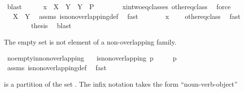 \begin{isabellebody}
\ blast\isanewline
\ \ \ \ \isamarkupfalse%
\ {\isachardoublequoteopen}x\ {\isasymin}\ X\ {\isasyminter}\ Y\ {\isasymand}\ Y\ {\isasymin}\ P{\isachardoublequoteclose}\isanewline
\ \ \ \ \ \ \isamarkupfalse%
\ x{\isacharunderscore}in{\isacharunderscore}two{\isacharunderscore}eq{\isacharunderscore}classes\ other{\isacharunderscore}eq{\isacharunderscore}class\ \isamarkupfalse%
\ force\isanewline
\ \ \ \ \isamarkupfalse%
\ \isamarkupfalse%
\ {\isachardoublequoteopen}X\ {\isacharequal}\ Y{\isachardoublequoteclose}\ \isamarkupfalse%
\ assms\ is{\isacharunderscore}non{\isacharunderscore}overlapping{\isacharunderscore}def\ \isamarkupfalse%
\ fast\isanewline
\ \ \ \ \isamarkupfalse%
\ \isamarkupfalse%
\ {\isachardoublequoteopen}x\ {\isasymin}\ {\isacharbraceleft}{\isacharbraceright}{\isachardoublequoteclose}\ \isamarkupfalse%
\ other{\isacharunderscore}eq{\isacharunderscore}class\ \isamarkupfalse%
\ fast\isanewline
\ \ \isacommand{{\isacharbraceright}}\isamarkupfalse%
\isanewline
\ \ \isamarkupfalse%
\ \isamarkupfalse%
\ {\isacharquery}thesis\ \isamarkupfalse%
\ blast\isanewline
{}\isamarkupfalse%
%
\endisatagproof
{\isafoldproof}%
%
\isadelimproof
%
\endisadelimproof
%
\begin{isamarkuptext}%
The empty set is not element of a non-overlapping family.%
\end{isamarkuptext}%
\isamarkuptrue%
\isamarkupfalse%
\ no{\isacharunderscore}empty{\isacharunderscore}in{\isacharunderscore}non{\isacharunderscore}overlapping{\isacharcolon}\isanewline
\ \ \ {\isachardoublequoteopen}is{\isacharunderscore}non{\isacharunderscore}overlapping\ p{\isachardoublequoteclose}\isanewline
\ \ \ {\isachardoublequoteopen}{\isacharbraceleft}{\isacharbraceright}\ {\isasymnotin}\ p{\isachardoublequoteclose}\isanewline
%
\isadelimproof
\isanewline
\ \ %
\endisadelimproof
%
\isatagproof
{}\isamarkupfalse%
\ assms\ is{\isacharunderscore}non{\isacharunderscore}overlapping{\isacharunderscore}def\ \isamarkupfalse%
\ fast%
\endisatagproof
{\isafoldproof}%
%
\isadelimproof
%
\endisadelimproof
%
\begin{isamarkuptext}%
 is a partition of the set . The infix notation takes the form ``noun-verb-object''%
\end{isamarkuptext}%

\end{isabellebody}
